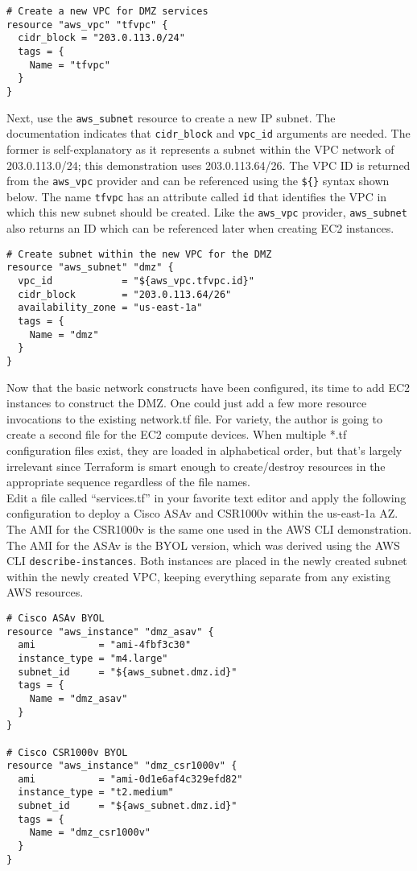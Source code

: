 \begin{verbatim}
# Create a new VPC for DMZ services
resource "aws_vpc" "tfvpc" {
  cidr_block = "203.0.113.0/24"
  tags = {
    Name = "tfvpc"
  }
}
\end{verbatim}

Next, use the \verb|aws_subnet| resource to create a new IP subnet. The
documentation indicates that \verb|cidr_block| and \verb|vpc_id| arguments are needed.
The former is self-explanatory as it represents a subnet within the VPC
network of 203.0.113.0/24; this demonstration uses 203.0.113.64/26. The VPC ID
is returned from the \verb|aws_vpc| provider and can be referenced using the \verb|${}|
syntax shown below. The name \verb|tfvpc| has an attribute called \verb|id| that
identifies the VPC in which this new subnet should be created. Like the
\verb|aws_vpc| provider, \verb|aws_subnet| also returns an ID which can be referenced
later when creating EC2 instances.

\begin{verbatim}
# Create subnet within the new VPC for the DMZ
resource "aws_subnet" "dmz" {
  vpc_id            = "${aws_vpc.tfvpc.id}"
  cidr_block        = "203.0.113.64/26"
  availability_zone = "us-east-1a"
  tags = {
    Name = "dmz"
  }
}
\end{verbatim}

Now that the basic network constructs have been configured, its time to add
EC2 instances to construct the DMZ. One could just add a few more resource
invocations to the existing network.tf file. For variety, the author is going
to create a second file for the EC2 compute devices. When multiple *.tf
configuration files exist, they are loaded in alphabetical order, but that's
largely irrelevant since Terraform is smart enough to create/destroy resources
in the appropriate sequence regardless of the file names. \\

Edit a file called ``services.tf'' in your favorite text editor and apply the
following configuration to deploy a Cisco ASAv and CSR1000v within the
us-east-1a AZ. The AMI for the CSR1000v is the same one used in the AWS CLI
demonstration. The AMI for the ASAv is the BYOL version, which was derived
using the AWS CLI \verb|describe-instances|. Both instances are placed in the newly
created subnet within the newly created VPC, keeping everything separate from
any existing AWS resources.

\begin{verbatim}
# Cisco ASAv BYOL
resource "aws_instance" "dmz_asav" {
  ami           = "ami-4fbf3c30"
  instance_type = "m4.large"
  subnet_id     = "${aws_subnet.dmz.id}"
  tags = {
    Name = "dmz_asav"
  }
}

# Cisco CSR1000v BYOL
resource "aws_instance" "dmz_csr1000v" {
  ami           = "ami-0d1e6af4c329efd82"
  instance_type = "t2.medium"
  subnet_id     = "${aws_subnet.dmz.id}"
  tags = {
    Name = "dmz_csr1000v"
  }
}
\end{verbatim}

